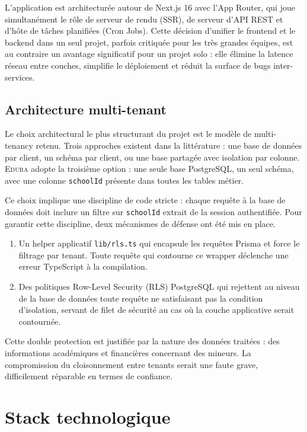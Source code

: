 \documentclass[12pt,a4paper,oneside]{report}
\newcommand{\edura}{\textsc{Edura}}
\begin{document}
L'application est architecturée autour de Next.js 16 avec l'App Router, qui joue simultanément le rôle de serveur de rendu (\ac{SSR}), de serveur d'API REST et d'hôte de tâches planifiées (Cron Jobs). Cette décision d'unifier le frontend et le backend dans un seul projet, parfois critiquée pour les très grandes équipes, est au contraire un avantage significatif pour un projet solo : elle élimine la latence réseau entre couches, simplifie le déploiement et réduit la surface de bugs inter-services.

\subsection{Architecture multi-tenant}

Le choix architectural le plus structurant du projet est le modèle de multi-tenancy retenu. Trois approches existent dans la littérature \autocite{walraven2011comparing} : une base de données par client, un schéma par client, ou une base partagée avec isolation par colonne. \edura{} adopte la troisième option : une seule base PostgreSQL, un seul schéma, avec une colonne \texttt{schoolId} présente dans toutes les tables métier.

Ce choix implique une discipline de code stricte : chaque requête à la base de données doit inclure un filtre sur \texttt{schoolId} extrait de la session authentifiée. Pour garantir cette discipline, deux mécanismes de défense ont été mis en place.

\begin{enumerate}
  \item Un helper applicatif \texttt{lib/rls.ts} qui encapsule les requêtes Prisma et force le filtrage par tenant. Toute requête qui contourne ce wrapper déclenche une erreur TypeScript à la compilation.
  \item Des politiques Row-Level Security (RLS) PostgreSQL qui rejettent au niveau de la base de données toute requête ne satisfaisant pas la condition d'isolation, servant de filet de sécurité au cas où la couche applicative serait contournée.
\end{enumerate}

Cette double protection est justifiée par la nature des données traitées : des informations académiques et financières concernant des mineurs. La compromission du cloisonnement entre tenants serait une faute grave, difficilement réparable en termes de confiance.

\section{Stack technologique}
\end{document}
